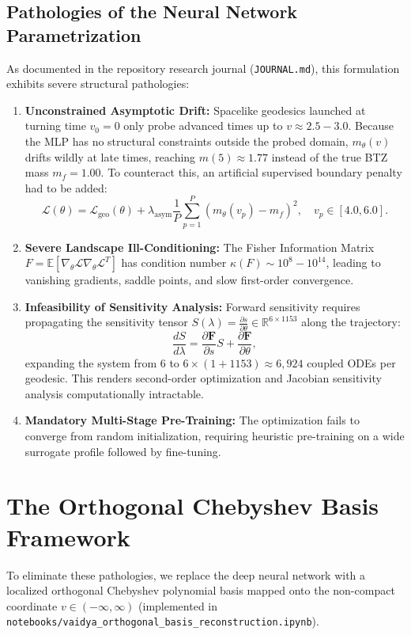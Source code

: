 \documentclass[11pt,a4paper]{article}
\begin{document}
\subsection{Pathologies of the Neural Network Parametrization}
As documented in the repository research journal (\texttt{JOURNAL.md}), this formulation exhibits severe structural pathologies:
\begin{enumerate}
    \item \textbf{Unconstrained Asymptotic Drift:} Spacelike geodesics launched at turning time $v_0 = 0$ only probe advanced times up to $v \approx 2.5 - 3.0$. Because the MLP has no structural constraints outside the probed domain, $m_\theta(v)$ drifts wildly at late times, reaching $m(5) \approx 1.77$ instead of the true BTZ mass $m_f = 1.00$. To counteract this, an artificial supervised boundary penalty had to be added:
    \begin{equation}
        \mathcal{L}(\theta) = \mathcal{L}_{\mathrm{geo}}(\theta) + \lambda_{\mathrm{asym}} \frac{1}{P} \sum_{p=1}^P (m_\theta(v_p) - m_f)^2, \quad v_p \in [4.0, 6.0].
    \end{equation}
    \item \textbf{Severe Landscape Ill-Conditioning:} The Fisher Information Matrix $F = \mathbb{E}[\nabla_\theta \mathcal{L} \nabla_\theta \mathcal{L}^T]$ has condition number $\kappa(F) \sim 10^8 - 10^{14}$, leading to vanishing gradients, saddle points, and slow first-order convergence.
    \item \textbf{Infeasibility of Sensitivity Analysis:} Forward sensitivity requires propagating the sensitivity tensor $S(\lambda) = \frac{\partial s}{\partial \theta} \in \mathbb{R}^{6 \times 1153}$ along the trajectory:
    \begin{equation}
        \frac{d S}{d\lambda} = \frac{\partial \mathbf{F}}{\partial s} S + \frac{\partial \mathbf{F}}{\partial \theta},
    \end{equation}
    expanding the system from $6$ to $6 \times (1 + 1153) \approx 6{,}924$ coupled ODEs per geodesic. This renders second-order optimization and Jacobian sensitivity analysis computationally intractable.
    \item \textbf{Mandatory Multi-Stage Pre-Training:} The optimization fails to converge from random initialization, requiring heuristic pre-training on a wide surrogate profile followed by fine-tuning.
\end{enumerate}

\section{The Orthogonal Chebyshev Basis Framework}
To eliminate these pathologies, we replace the deep neural network with a localized orthogonal Chebyshev polynomial basis mapped onto the non-compact coordinate $v \in (-\infty, \infty)$ (implemented in \texttt{notebooks/vaidya\_orthogonal\_basis\_reconstruction.ipynb}).
\end{document}
